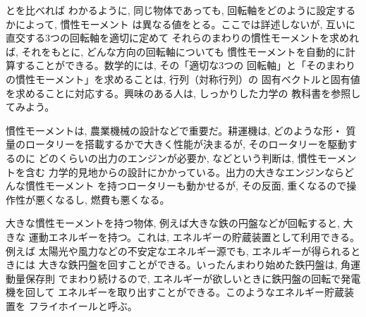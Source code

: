 とを比べれば
わかるように, 同じ物体であっても, 回転軸をどのように設定するかによって, 慣性モーメント
は異なる値をとる。ここでは詳述しないが, 互いに直交する3つの回転軸を適切に定めて
それらのまわりの慣性モーメントを求めれば, それをもとに, どんな方向の回転軸についても
慣性モーメントを自動的に計算することができる。数学的には, その「適切な3つの
回転軸」と「そのまわりの慣性モーメント」を求めることは, 行列（対称行列）の
固有ベクトルと固有値を求めることに対応する。興味のある人は, しっかりした力学の
教科書を参照してみよう。\mv

慣性モーメントは, 農業機械の設計などで重要だ。耕運機は, どのような形・
質量のロータリーを搭載するかで大きく性能が決まるが, そのロータリーを駆動するのに
どのくらいの出力のエンジンが必要か, などという判断は, 慣性モーメントを含む
力学的見地からの設計にかかっている。出力の大きなエンジンならどんな慣性モーメント
を持つロータリーも動かせるが, その反面, 重くなるので操作性が悪くなるし, 
燃費も悪くなる。

大きな慣性モーメントを持つ物体, 例えば大きな鉄の円盤などが回転すると, 大きな
運動エネルギーを持つ。これは, エネルギーの貯蔵装置として利用できる。例えば
太陽光や風力などの不安定なエネルギー源でも, エネルギーが得られるときには
大きな鉄円盤を回すことができる。いったんまわり始めた鉄円盤は, 角運動量保存則
でまわり続けるので, エネルギーが欲しいときに鉄円盤の回転で発電機を回して
エネルギーを取り出すことができる。このようなエネルギー貯蔵装置を
フライホイールと呼ぶ。\mv

